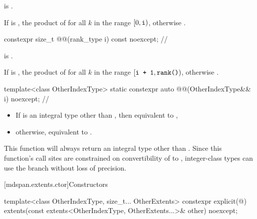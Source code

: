 \begin{itemdescr}
\pnum
\expects
{} is .

\pnum
\returns
If  is ,
the product of  for all $k$ in the range $[0, \texttt{i})$,
otherwise .
\end{itemdescr}

\begin{itemdecl}
constexpr size_t @@(rank_type i) const noexcept;       // \expos
\end{itemdecl}

\begin{itemdescr}
\pnum
\expects
{} is .

\pnum
\returns
If  is ,
the product of 
for all $k$ in the range $[\texttt{i + 1}, \texttt{rank()})$,
otherwise .
\end{itemdescr}

\begin{itemdecl}
template<class OtherIndexType>
  static constexpr auto @@(OtherIndexType&& i) noexcept;        // \expos
\end{itemdecl}

\begin{itemdescr}
\pnum
\effects
\begin{itemize}
\item
If  is an integral type other than ,
then equivalent to ,
\item
otherwise, equivalent to .
\end{itemize}
\begin{note}
This function will always return an integral type other than .
Since this function's call sites are constrained on
convertibility of  to ,
integer-class types can use the  branch
without loss of precision.
\end{note}
\end{itemdescr}

[mdspan.extents.ctor]{Constructors}

%
\begin{itemdecl}
template<class OtherIndexType, size_t... OtherExtents>
  constexpr explicit(@\seebelow@)
    extents(const extents<OtherIndexType, OtherExtents...>& other) noexcept;
\end{itemdecl}

